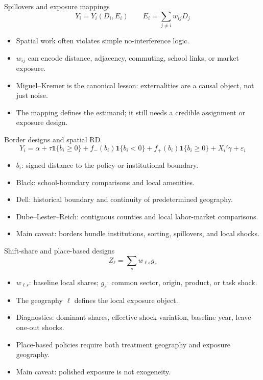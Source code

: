 \documentclass[aspectratio=169,11pt]{beamer}
\newcommand{\1}{\mathbf{1}}
\begin{document}
\begin{frame}{Spillovers and exposure mappings}
\small
\[
Y_i = Y_i(D_i,E_i)
\qquad
E_i=\sum_{j\neq i}w_{ij}D_j
\]

\begin{itemize}
    \item Spatial work often violates simple no-interference logic.
    \item \(w_{ij}\) can encode distance, adjacency, commuting, school links, or market exposure.
    \item Miguel--Kremer is the canonical lesson: externalities are a causal object, not just noise.
    \item The mapping defines the estimand; it still needs a credible assignment or exposure design.
\end{itemize}
\end{frame}

\begin{frame}{Border designs and spatial RD}
\small
\[
Y_i =
\alpha+\tau\1\{b_i\ge 0\}
+f_-(b_i)\1\{b_i<0\}
+f_+(b_i)\1\{b_i\ge0\}
+X_i'\gamma+\varepsilon_i
\]

\begin{itemize}
    \item \(b_i\): signed distance to the policy or institutional boundary.
    \item Black: school-boundary comparisons and local amenities.
    \item Dell: historical boundary and continuity of predetermined geography.
    \item Dube--Lester--Reich: contiguous counties and local labor-market comparisons.
    \item Main caveat: borders bundle institutions, sorting, spillovers, and local shocks.
\end{itemize}
\end{frame}

\begin{frame}{Shift-share and place-based designs}
\small
\[
Z_\ell=\sum_s w_{\ell s}g_s
\]

\begin{itemize}
    \item \(w_{\ell s}\): baseline local shares; \(g_s\): common sector, origin, product, or task shock.
    \item The geography \(\ell\) defines the local exposure object.
    \item Diagnostics: dominant shares, effective shock variation, baseline year, leave-one-out shocks.
    \item Place-based policies require both treatment geography and exposure geography.
    \item Main caveat: polished exposure is not exogeneity.
\end{itemize}
\end{frame}
\end{document}

